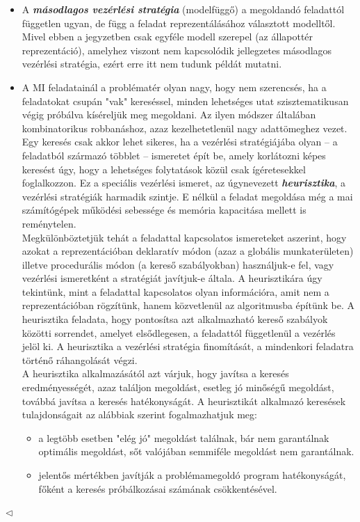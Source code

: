 \documentclass[12pt,margin=0px]{article}
\begin{document}
{\begin{itemize}
                \item A \textbf{\emph{másodlagos vezérlési stratégia}} (modelfüggő) a megoldandó feladattól független ugyan, de függ a feladat reprezentálásához választott modelltől. Mivel ebben a jegyzetben csak egyféle modell szerepel (az állapottér reprezentáció), amelyhez viszont nem kapcsolódik jellegzetes másodlagos vezérlési stratégia, ezért erre itt nem tudunk példát mutatni.
                \item A MI feladatainál a problématér olyan nagy, hogy nem szerencsés, ha a feladatokat csupán "vak" kereséssel, minden lehetséges utat szisztematikusan végig próbálva kíséreljük meg megoldani. Az ilyen módszer általában kombinatorikus robbanáshoz, azaz kezelhetetlenül nagy adattömeghez vezet. Egy keresés csak akkor lehet sikeres, ha a vezérlési stratégiájába olyan – a feladatból származó többlet – ismeretet épít be, amely korlátozni képes keresést úgy, hogy a lehetséges folytatások közül csak ígéretesekkel foglalkozzon. Ez a speciális vezérlési ismeret, az úgynevezett \emph{\textbf{heurisztika}}, a vezérlési stratégiák harmadik szintje. E nélkül a feladat megoldása még a mai számítógépek működési sebessége és memória kapacitása mellett is reménytelen.\\

                    Megkülönböztetjük tehát a feladattal kapcsolatos ismereteket aszerint, hogy azokat a reprezentációban deklaratív módon (azaz a globális munkaterületen) illetve procedurális módon (a kereső szabályokban) használjuk-e fel, vagy vezérlési ismeretként a stratégiát javítjuk-e általa. A heurisztikára úgy tekintünk, mint a feladattal kapcsolatos olyan információra, amit nem a reprezentációban rögzítünk, hanem közvetlenül az algoritmusba építünk be. A heurisztika feladata, hogy pontosítsa azt alkalmazható kereső szabályok közötti sorrendet, amelyet elsődlegesen, a feladattól függetlenül a vezérlés jelöl ki. A heurisztika a vezérlési stratégia finomítását, a mindenkori feladatra történő ráhangolását végzi.\\

                    A heurisztika alkalmazásától azt várjuk, hogy javítsa a keresés eredményességét, azaz találjon megoldást, esetleg jó minőségű megoldást, továbbá javítsa a keresés hatékonyságát. A heurisztikát alkalmazó keresések tulajdonságait az alábbiak szerint fogalmazhatjuk meg:
                    \begin{itemize}
                        \item a legtöbb esetben "elég jó" megoldást találnak, bár nem garantálnak optimális megoldást, sőt valójában semmiféle megoldást nem garantálnak.
                        \item jelentős mértékben javítják a problémamegoldó program hatékonyságát, főként a keresés próbálkozásai számának csökkentésével.
                    \end{itemize}
   \end{itemize}
    $\triangleleft$ \faLightbulbO}
\end{document}
